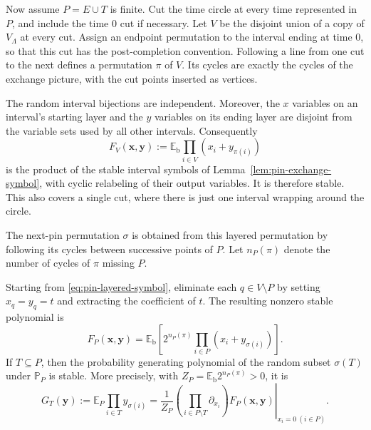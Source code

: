 Now assume $P=E\cup T$ is finite.  Cut the time circle at every time
represented in $P$, and include the time $0$ cut if necessary.  Let
$V$ be the disjoint union of a copy of $V_\Lambda$ at every cut.
Assign an endpoint permutation to the interval ending at time $0$,
so that this cut has the post-completion convention.  Following a line
from one cut to the next defines a permutation $\pi$ of $V$.  Its
cycles are exactly the cycles of the exchange picture, with the cut
points inserted as vertices.

The random interval bijections are independent.  Moreover, the $x$
variables on an interval's starting layer and the $y$ variables on its
ending layer are disjoint from the variable sets used by all other
intervals.  Consequently
\begin{equation}\label{eq:pin-layered-symbol}
 F_V(\boldsymbol x,\boldsymbol y)
       :=\mathbb E_{\mathrm b}\prod_{i\in V}(x_i+y_{\pi(i)})
\end{equation}
is the product of the stable interval symbols of
Lemma~\ref{lem:pin-exchange-symbol}, with cyclic relabeling of their
output variables.  It is therefore stable.  This also covers a single
cut, where there is just one interval wrapping around the circle.

The next-pin permutation $\sigma$ is obtained from this layered
permutation by following its cycles between successive points of $P$.
Let $n_P(\pi)$ denote the number of cycles of $\pi$ missing $P$.

\begin{lemma}\label{lem:pin-splicing}
Starting from \eqref{eq:pin-layered-symbol}, eliminate each $q\in V\setminus P$
by setting $x_q=y_q=t$ and extracting the coefficient of $t$.
The resulting nonzero stable polynomial is
\begin{equation}\label{eq:pin-spliced-symbol}
 F_P(\boldsymbol x,\boldsymbol y)
   =\mathbb E_{\mathrm b}
       \left[2^{n_P(\pi)}\prod_{i\in P}(x_i+y_{\sigma(i)})\right].
\end{equation}
If $T\subseteq P$, then the probability generating polynomial of the
random subset $\sigma(T)$ under $\mathbb P_P$ is stable.  More precisely,
with $Z_P=\mathbb E_{\mathrm b}2^{n_P(\pi)}>0$, it is
\begin{equation}\label{eq:pin-all-x-zero}
 G_T(\boldsymbol y)
  :=\mathbb E_P\prod_{i\in T}y_{\sigma(i)}
   =\frac1{Z_P}
     \left.
       \left(\prod_{i\in P\setminus T}\partial_{x_i}\right)
       F_P(\boldsymbol x,\boldsymbol y)
     \right|_{x_i=0\ (i\in P)}.
\end{equation}
\end{lemma}

